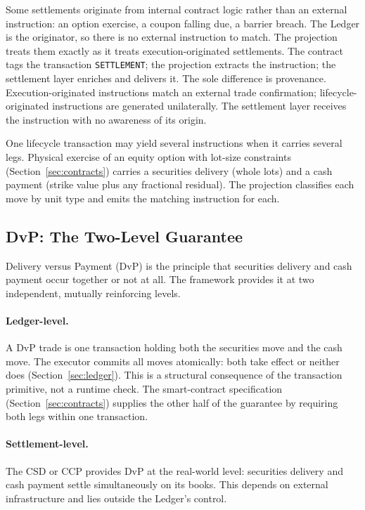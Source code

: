Some settlements originate from internal contract logic rather than an external instruction: an option exercise, a coupon falling due, a barrier breach. The Ledger is the originator, so there is no external instruction to match. The projection treats them exactly as it treats execution-originated settlements. The contract tags the transaction \texttt{SETTLEMENT}; the projection extracts the instruction; the settlement layer enriches and delivers it. The sole difference is provenance. Execution-originated instructions match an external trade confirmation; lifecycle-originated instructions are generated unilaterally. The settlement layer receives the instruction with no awareness of its origin.

One lifecycle transaction may yield several instructions when it carries several legs. Physical exercise of an equity option with lot-size constraints (Section~\ref{sec:contracts}) carries a securities delivery (whole lots) and a cash payment (strike value plus any fractional residual). The projection classifies each move by unit type and emits the matching instruction for each.

\subsection{DvP: The Two-Level Guarantee}
\label{sec:settlement-dvp}

Delivery versus Payment (DvP) is the principle that securities delivery and cash payment occur together or not at all. The framework provides it at two independent, mutually reinforcing levels.

\paragraph{Ledger-level.} A DvP trade is one transaction holding both the securities move and the cash move. The executor commits all moves atomically: both take effect or neither does (Section~\ref{sec:ledger}). This is a structural consequence of the transaction primitive, not a runtime check. The smart-contract specification (Section~\ref{sec:contracts}) supplies the other half of the guarantee by requiring both legs within one transaction.

\paragraph{Settlement-level.} The CSD or CCP provides DvP at the real-world level: securities delivery and cash payment settle simultaneously on its books. This depends on external infrastructure and lies outside the Ledger's control.

